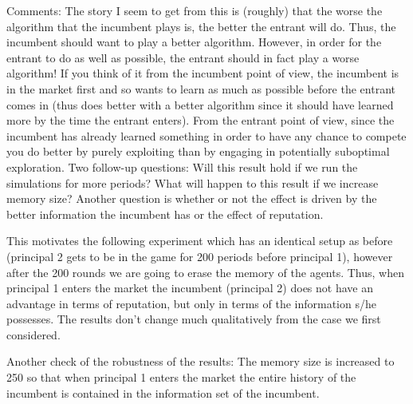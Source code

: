 \documentclass[11pt,letterpaper]{article}
\begin{document}
Comments: The story I seem to get from this is (roughly) that the worse the algorithm that the incumbent plays is, the better the entrant will do. Thus, the incumbent should want to play a better algorithm. However, in order for the entrant to do as well as possible, the entrant should in fact play a worse algorithm! If you think of it from the incumbent point of view, the incumbent is in the market first and so wants to learn as much as possible before the entrant comes in (thus does better with a better algorithm since it should have learned more by the time the entrant enters).  From the entrant point of view, since the incumbent has already learned something in order to have any chance to compete you do better by purely exploiting than by engaging in potentially suboptimal exploration. Two follow-up questions: Will this result hold if we run the simulations for more periods? What will happen to this result if we increase memory size? Another question is whether or not the effect is driven by the better information the incumbent has or the effect of reputation.
\vspace{0.5cm}

This motivates the following experiment which has an identical setup as before (principal 2 gets to be in the game for 200 periods before principal 1), however after the 200 rounds we are going to erase the memory of the agents. Thus, when principal 1 enters the market the incumbent (principal 2) does not have an advantage in terms of reputation, but only in terms of the information s/he possesses. The results don't change much qualitatively from the case we first considered.


Another check of the robustness of the results: The memory size is increased to 250 so that when principal 1 enters the market the entire history of the incumbent is contained in the information set of the incumbent.

\end{document}
